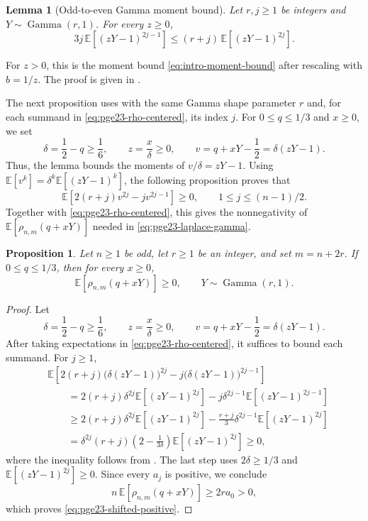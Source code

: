 \documentclass[11pt]{article}
\newtheorem{proposition}[theorem]{Proposition}
\newtheorem{lemma}[theorem]{Lemma}
\theoremstyle{remark}
\numberwithin{equation}{section}
\newcommand{\E}{\mathbb E}
\newcommand{\GammaLaw}{\operatorname{Gamma}}
\begin{document}
\begin{lemma}[Odd-to-even Gamma moment bound]\label{lem:pge23-gamma-moment}
  Let $r,j\ge1$ be integers and $Y\sim\GammaLaw(r,1)$.
  For every $z\ge0$,
  \begin{equation*}
    3j\,\E\left[(zY-1)^{2j-1}\right]
    \le(r+j)\,\E\left[(zY-1)^{2j}\right].
  \end{equation*}
\end{lemma}

For $z>0$, this is the moment bound \eqref{eq:intro-moment-bound}
after rescaling with $b=1/z$.
The proof is given in .

The next proposition uses  with the same
Gamma shape parameter $r$ and, for each summand in
\eqref{eq:pge23-rho-centered}, its index $j$. For $0\le q\le1/3$
and $x\ge0$, we set
\[
  \delta=\frac12-q\ge\frac16,
  \qquad z=\frac{x}{\delta}\ge0,
  \qquad v=q+xY-\frac12=\delta(zY-1).
\]
Thus, the lemma bounds the moments of $v/\delta=zY-1$.
Using $\E\left[v^k\right]=\delta^k\E\left[(zY-1)^k\right]$, the following proposition proves that
\[
  \E\left[2(r+j)v^{2j}-jv^{2j-1}\right]\ge0,
  \qquad 1\le j\le(n-1)/2.
\]
Together with \eqref{eq:pge23-rho-centered}, this gives
the nonnegativity of
$\E\left[\rho_{n,m}(q+xY)\right]$ needed in
\eqref{eq:pge23-laplace-gamma}.

\begin{proposition}\label{prop:pge23-gamma-positive}
  Let $n\ge1$ be odd, let $r\ge1$ be an integer, and set $m=n+2r$.
  If $0\le q\le1/3$, then for every $x\ge0$,
  \begin{equation}\label{eq:pge23-shifted-positive}
    \E\left[\rho_{n,m}(q+xY)\right]\ge0,
    \qquad Y\sim\GammaLaw(r,1).
  \end{equation}
\end{proposition}

\begin{proof}
  Let
  \[
    \delta=\frac12-q\ge\frac16,
    \qquad z=\frac{x}{\delta}\ge0,
    \qquad v=q+xY-\frac12=\delta(zY-1).
  \]
  After taking expectations in \eqref{eq:pge23-rho-centered}, it suffices to
  bound each summand.
  For $j\ge1$,
  \begin{align*}
    &\E\left[
    2(r+j)\bigl(\delta(zY-1)\bigr)^{2j}
    -j\bigl(\delta(zY-1)\bigr)^{2j-1}
    \right]\\
    &\qquad=2(r+j)\delta^{2j}\E\left[(zY-1)^{2j}\right]
      -j\delta^{2j-1}\E\left[(zY-1)^{2j-1}\right]\\
    &\qquad\ge2(r+j)\delta^{2j}\E\left[(zY-1)^{2j}\right]
      -\frac{r+j}{3}\delta^{2j-1}\E\left[(zY-1)^{2j}\right]\\
    &\qquad=\delta^{2j}(r+j)
    \left(2-\frac{1}{3\delta}\right)
    \E\left[(zY-1)^{2j}\right]
    \ge0,
  \end{align*}
  where the inequality follows from . The last
  step uses $2\delta\ge1/3$ and $\E\left[(zY-1)^{2j}\right]\ge0$.
  Since every $a_j$ is positive, we conclude
  \[
    n\,\E\left[\rho_{n,m}(q+xY)\right]\ge2ra_0>0,
  \]
  which proves \eqref{eq:pge23-shifted-positive}.
\end{proof}
\end{document}
